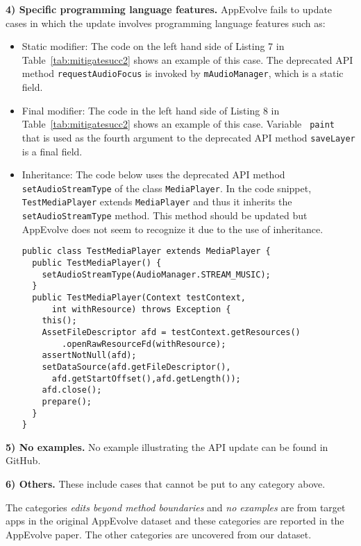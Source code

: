 \vspace{0.25\baselineskip}\noindent\textbf{4) Specific programming language features.} AppEvolve fails to update cases in which the update involves programming language features such as:
\begin{itemize}
\item Static modifier:  The code on the left hand side of Listing 7 in
Table~\ref{tab:mitigatesucc2} shows an example of this case.  The deprecated
API method {\tt requestAudioFocus} is invoked by {\tt mAudioManager}, which
is a static field.

\item Final modifier: The code in the left hand side of Listing 8 in
Table~\ref{tab:mitigatesucc2} shows an example of this case.  Variable {\tt
paint} that is used as the fourth argument to the deprecated API method
{\tt saveLayer} is a final field.

\item Inheritance: The code below uses the deprecated API method {\tt
	set\-Audio\-Stream\-Type} of the class {\tt MediaPlayer}. In the code snippet,
{\tt Test\-Media\-Player} extends {\tt MediaPlayer} and thus it inherits
the {\tt setAudioStreamType} method. This method should be updated but
AppEvolve does not seem to recognize it due to the use of inheritance.
\begin{lstlisting}[language=text]
public class TestMediaPlayer extends MediaPlayer {
  public TestMediaPlayer() {
    setAudioStreamType(AudioManager.STREAM_MUSIC);
  }
  public TestMediaPlayer(Context testContext,
      int withResource) throws Exception {
    this();
    AssetFileDescriptor afd = testContext.getResources()
        .openRawResourceFd(withResource);
    assertNotNull(afd);
    setDataSource(afd.getFileDescriptor(),
      afd.getStartOffset(),afd.getLength()); 
    afd.close();
    prepare();
  }
}
\end{lstlisting}

\end{itemize}

\vspace{0.25\baselineskip}\noindent\textbf{5) No examples.} No example
illustrating the API update can be found in GitHub.

\vspace{0.25\baselineskip}\noindent\textbf{6) Others.} These include cases that cannot be put to any category above.

\vspace{0.25\baselineskip}\noindent The categories {\em edits
beyond method boundaries} and {\em no examples} are from target apps in the
original AppEvolve dataset and these categories are reported in the
AppEvolve paper. The other categories are uncovered from our dataset.


